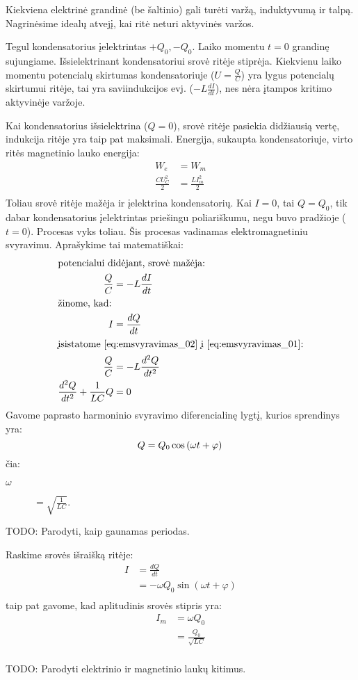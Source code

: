 Kiekviena elektrinė grandinė (be šaltinio) gali turėti varžą, induktyvumą
ir talpą. Nagrinėsime idealų atvejį, kai ritė neturi aktyvinės varžos.

Tegul kondensatorius įelektrintas $+Q_{0}, -Q_{0}$. Laiko momentu $t=0$
grandinę sujungiame. Išsielektrinant kondensatoriui srovė ritėje stiprėja.
Kiekvienu laiko momentu potencialų skirtumas kondensatoriuje
($U = \frac{Q}{C}$) yra lygus potencialų skirtumui ritėje, tai yra
saviindukcijos evj. ($-L\frac{dI}{dt}$), nes nėra įtampos kritimo
aktyvinėje varžoje.

Kai kondensatorius išsielektrina ($Q = 0$), srovė ritėje pasiekia
didžiausią vertę, indukcija ritėje yra taip pat maksimali. Energija,
sukaupta kondensatoriuje, virto ritės magnetinio lauko energija:
\begin{align*}
  W_{e} &= W_{m} \\
  \frac{CU_{C}^{2}}{2} &= \frac{LI_{m}^{2}}{2} \\
\end{align*}
Toliau srovė ritėje mažėja ir įelektrina kondensatorių. Kai $I = 0$, 
tai $Q = Q_{0}$, tik dabar kondensatorius įelektrintas priešingu
poliariškumu, negu buvo pradžioje ($t = 0$). Procesas vyks toliau.
Šis procesas vadinamas elektromagnetiniu svyravimu. Aprašykime
tai matematiškai:
\begin{align}
  \intertext{potencialui didėjant, srovė mažėja:}
  \frac{Q}{C}
    &= - L\frac{dI}{dt} \label{eq:emsvyravimas_01} \\
  \intertext{žinome, kad:}
  I
    &= \frac{dQ}{dt} \label{eq:emsvyravimas_02} \\
  \intertext{įsistatome \ref{eq:emsvyravimas_02} į
  \ref{eq:emsvyravimas_01}:}
  \frac{Q}{C}
    &= - L \frac{d^{2}Q}{dt^{2}} \\
  \frac{d^{2}Q}{dt^{2}} + \frac{1}{LC}Q &= 0 \\
\end{align}
Gavome paprasto harmoninio svyravimo diferencialinę lygtį, kurios
sprendinys yra:
\begin{equation*}
  Q = Q_{0} \cos \left( \omega t + \varphi \right) \\
\end{equation*}
čia:
\begin{description}
  \item[$\omega$] $= \sqrt{\frac{1}{LC}}$.
\end{description}

TODO: Parodyti, kaip gaunamas periodas.

Raskime srovės išraišką ritėje:
\begin{align*}
  I
    &= \frac{dQ}{dt} \\
    &= - \omega Q_{0} \sin \left( \omega t + \varphi \right) \\
\end{align*}
taip pat gavome, kad aplitudinis srovės stipris yra:
\begin{align*}
  I_{m}
    &= \omega Q_{0} \\
    &= \frac{Q_{0}}{\sqrt{LC}} \\
\end{align*}

TODO: Parodyti elektrinio ir magnetinio laukų kitimus.
